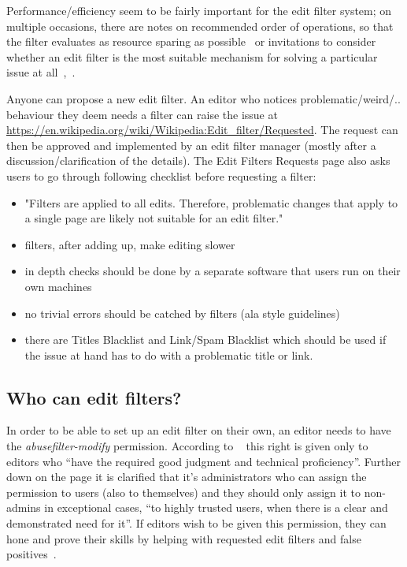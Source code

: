 Performance/efficiency seem to be fairly important for the edit filter system;
on multiple occasions, there are notes on recommended order of operations, so that the filter evaluates as resource sparing as possible~\cite{Wikipedia:EditFilterInstructions} or invitations to consider whether an edit filter is the most suitable mechanism for solving a particular issue at all~\cite{Wikipedia:EditFilter},~\cite{Wikipedia:EditFilterRequested}.



Anyone can propose a new edit filter.
An editor who notices problematic/weird/.. behaviour they deem needs a filter can raise the issue at \url{https://en.wikipedia.org/wiki/Wikipedia:Edit_filter/Requested}.
The request can then be approved and implemented by an edit filter manager (mostly after a discussion/clarification of the details).
The Edit Filters Requests page also asks users to go through following checklist before requesting a filter:
\begin{itemize}
    \item "Filters are applied to all edits. Therefore, problematic changes that apply to a single page are likely not suitable for an edit filter."
    \item filters, after adding up, make editing slower
    \item in depth checks should be done by a separate software that users run on their own machines
    \item no trivial errors should be catched by filters (ala style guidelines)
    \item there are Titles Blacklist and Link/Spam Blacklist which should be used if the issue at hand has to do with a problematic title or link.
\end{itemize}


\subsection{Who can edit filters?}
\label{section:who-can-edit}

In order to be able to set up an edit filter on their own, an editor needs to have the \emph{abusefilter-modify} permission.
According to ~\cite{Wikipedia:EditFilter} this right is given only to editors who ``have the required good judgment and technical proficiency''.
Further down on the page it is clarified that it's administrators who can assign the permission to users (also to themselves) and they should only assign it to non-admins in exceptional cases, ``to highly trusted users, when there is a clear and demonstrated need for it''.
If editors wish to be given this permission, they can hone and prove their skills by helping with requested edit filters and false positives~\cite{Wikipedia:EditFilter}.

